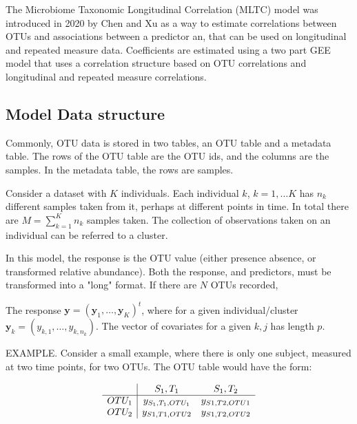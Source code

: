\documentclass[12pt]{article}
\begin{document}
The Microbiome Taxonomic Longitudinal Correlation (MLTC) model was introduced in 2020 by Chen and Xu\cite{chen2020generalized} as a way to estimate correlations between OTUs and associations between a predictor an, that can be used on longitudinal and repeated measure data. Coefficients are estimated using a two part GEE model that uses a correlation structure based on OTU correlations and longitudinal and repeated measure correlations.



\subsection{Model Data structure}
Commonly, OTU data is stored in two tables, an OTU table and a metadata table. The rows of the OTU table are the OTU ids, and the columns are the samples. In the metadata table, the rows are samples.

Consider a dataset with $K$ individuals. Each individual $k$, $k = 1, \ldots K$ has $n_k$ different samples taken from it, perhaps at different points in time. In total there are $M = \sum_{k=1}^K n_k$ samples taken. The collection of observations taken on an individual can be referred to a cluster.


In this model, the response is the OTU value (either presence absence, or transformed relative abundance). Both the response, and predictors, must be transformed into a "long" format. If there are $N$ OTUs recorded,

The response $\mathbf{y} = (\mathbf{y}_1, \ldots, \mathbf{y}_K)^t$, where for a given individual/cluster $\mathbf{y}_k = (y_{k,1}, \ldots, y_{k,n_k})$. The vector of covariates for a given $k,j$ has length $p$.

EXAMPLE. Consider a small example, where there is only one subject, measured at two time points, for two OTUs. The OTU table would have the form:

$$
\begin{array}{c| c c}
  & S_1,T_1 & S_1,T_2\\
  \hline
  OTU_1 & y_{S_1,T_1,OTU_1} & y_{S1,T2,OTU1}\\
  OTU_2 & y_{S1,T1,OTU2} & y_{S1,T2,OTU2}\\
\end{array}
$$
\end{document}
